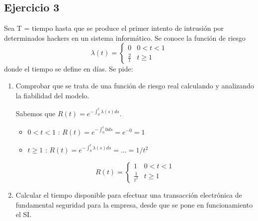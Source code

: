\subsection{Ejercicio 3}
Sea T = tiempo hasta que se produce el primer intento de intrusión por determinados hackers en un sistema informático. Se conoce la función de riesgo
\[ \lambda(t)=\begin{cases} 
      0 & 0<t<1 \\
      \frac{2}{t} & t\geq 1 
   \end{cases}
\]
donde el tiempo se define en días. Se pide:
\begin{enumerate}
    \item Comprobar  que  se  trata  de  una  función  de  riesgo  real  calculando  y  analizando  la  fiabilidad  del modelo.
    \begin{tcolorbox}[colback=white,colframe=cyan!50!black,fonttitle=\bfseries]
    Sabemos que $R(t) = e^{-\int_0^t \lambda(s) ds}$.
    \begin{itemize}
        \item $0<t<1$ : $R(t)=e^{-\int_0^t 0 ds} = e^{-0}=1$
        \item $t\geq 1$ : $R(t)=e^{-\int_0^t \lambda(s) ds} = ... = 1/t^2$
    \end{itemize}
    \[ R(t)=\begin{cases} 
      1 & 0<t<1 \\
      \frac{1}{t^2} & t\geq 1 
   \end{cases}
    \]  
        \begin{center}
        \end{center}
        \end{tcolorbox}
    \item Calcular  el  tiempo  disponible  para  efectuar  una  transacción  electrónica  de  fundamental  seguridad para la empresa, desde que se pone en funcionamiento el SI.
    \begin{tcolorbox}[colback=white,colframe=cyan!50!black,fonttitle=\bfseries]

\end{tcolorbox}
\end{enumerate}

